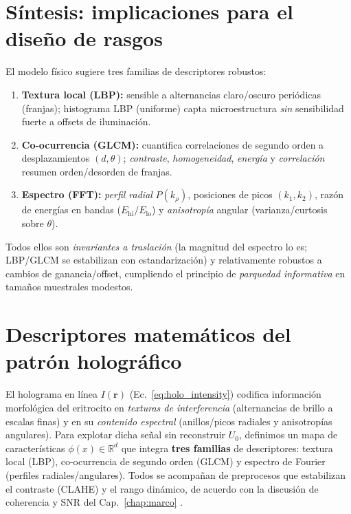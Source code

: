 \section{Síntesis: implicaciones para el diseño de rasgos}
El modelo físico sugiere tres familias de descriptores robustos:
\begin{enumerate}
\item \textbf{Textura local (LBP):} sensible a alternancias claro/oscuro periódicas (franjas); histograma LBP (uniforme) capta microestructura \emph{sin} sensibilidad fuerte a offsets de iluminación.
\item \textbf{Co-ocurrencia (GLCM):} cuantifica correlaciones de segundo orden a desplazamientos $(d,\theta)$; \emph{contraste}, \emph{homogeneidad}, \emph{energía} y \emph{correlación} resumen orden/desorden de franjas.
\item \textbf{Espectro (FFT):} \emph{perfil radial} $P(k_\rho)$, posiciones de picos $(k_1,k_2)$, razón de energías en bandas ($E_\text{hi}/E_\text{lo}$) y \emph{anisotropía} angular (varianza/curtosis sobre $\theta$).
\end{enumerate}
Todos ellos son \emph{invariantes a traslación} (la magnitud del espectro lo es; LBP/GLCM se estabilizan con estandarización) y relativamente robustos a cambios de ganancia/offset, cumpliendo el principio de \emph{parquedad informativa} en tamaños muestrales modestos.




\section{Descriptores matemáticos del patrón holográfico}
\label{sec:descriptores}

El holograma en línea $I(\mathbf{r})$ (Ec.~\eqref{eq:holo_intensity}) codifica información morfológica del eritrocito en \emph{texturas de interferencia} (alternancias de brillo a escalas finas) y en su \emph{contenido espectral} (anillos/picos radiales y anisotropías angulares). Para explotar dicha señal sin reconstruir $U_0$, definimos un mapa de características $\phi(x)\in\mathbb{R}^d$ que integra \textbf{tres familias} de descriptores: textura local (LBP), co-ocurrencia de segundo orden (GLCM) y espectro de Fourier (perfiles radiales/angulares). Todos se acompañan de preprocesos que estabilizan el contraste (CLAHE) y el rango dinámico, de acuerdo con la discusión de coherencia y SNR del Cap.~\ref{chap:marco} \cite{Zhou2019MedImageContrast,Chen2022Photonics}.

